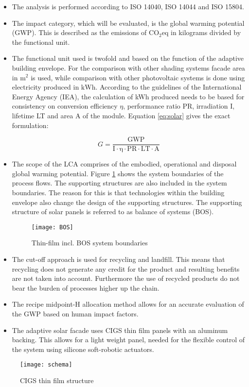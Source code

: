 
\begin{itemize}
\item The analysis is performed according to ISO 14040, ISO 14044 and ISO 15804. 
	\item The impact category, which will be evaluated, is the global warming potential (GWP). This is described as the emissions of ${\mathrm{CO_2eq}}$ in kilograms divided by the functional unit.
	\item The functional unit used is twofold and based on the function of the adaptive building envelope. For the comparison with other shading systems facade area in ${\mathrm{m^2}}$ is used, while comparison with other photovoltaic systems is done using electricity produced in ${\mathrm{kWh}}$. According to the guidelines of the International Energy Agency (IEA), the calculation of kWh produced needs to be based for consistency on conversion efficiency ${\eta}$, performance ratio PR, irradiation I, lifetime LT and area A of the module. Equation \ref{eq:solar} gives the exact formulation:
	
\begin{equation}
G=\frac{{\mathrm{GWP}}}{{\mathrm{I \cdot \eta  \cdot PR \cdot LT \cdot A}}}
\label{eq:solar}
\end{equation}	

	\item The scope of the LCA comprises of the  embodied, operational and disposal global warming potential. Figure \ref{fig:BOS} shows the system boundaries of the process flows. The supporting structures are also included in the system boundaries. The reason for this is that technologies within the building envelope also change the design of the supporting structures. The supporting structure of solar panels is referred to as balance of systems (BOS).

\begin{figure}[H]
\begin{center}
\texttt{[image: BOS]}
\caption{Thin-film incl. BOS system boundaries}
\label{fig:BOS}
\end{center}
\end{figure}	
	
	\item The cut-off approach is used for recycling and landfill. This means that recycling does not generate any credit for the product and resulting benefits are not taken into account. Furthermore the use of recycled products do not bear the burden of processes higher up the chain.
	\item The recipe midpoint-H allocation method allows for an accurate evaluation of the GWP based on human impact factors.
\item The adaptive solar facade uses CIGS thin film panels with an aluminum backing. This allows for a  light weight panel, needed for the flexible control of the system using silicone soft-robotic actuators.
\end{itemize}

\begin{figure}[H]
\begin{center}
\texttt{[image: schema]}
\caption{CIGS thin film structure}
\label{fig:schema}
\end{center}
\end{figure}